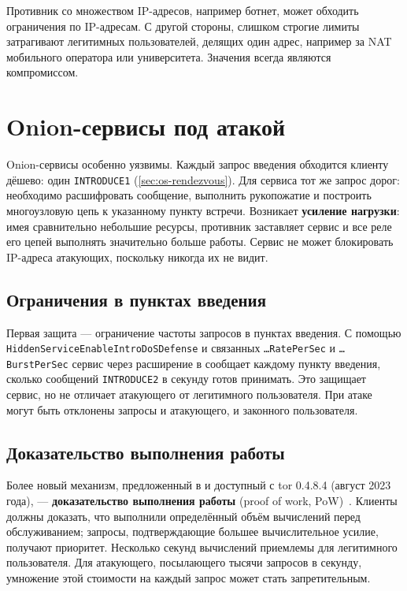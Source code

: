 \begin{attenzione}
Противник со множеством IP-адресов, например ботнет, может обходить ограничения по IP-адресам. С другой стороны, слишком строгие лимиты затрагивают легитимных пользователей, делящих один адрес, например за NAT мобильного оператора или университета. Значения всегда являются компромиссом.
\end{attenzione}

\section{Onion-сервисы под атакой}\label{sec:dos-onion}

Onion-сервисы особенно уязвимы. Каждый запрос введения обходится клиенту дёшево: один \texttt{INTRODUCE1} (\cref{sec:os-rendezvous}). Для сервиса тот же запрос дорог: необходимо расшифровать сообщение, выполнить рукопожатие и построить многоузловую цепь к указанному пункту встречи. Возникает \textbf{усиление нагрузки}: имея сравнительно небольшие ресурсы, противник заставляет сервис и все реле его цепей выполнять значительно больше работы. Сервис не может блокировать IP-адреса атакующих, поскольку никогда их не видит.

\subsection{Ограничения в пунктах введения}

Первая защита --- ограничение частоты запросов в пунктах введения. С помощью \texttt{HiddenService\-EnableIntroDoS\-Defense} и связанных \texttt{\ldots RatePerSec} и \texttt{\ldots BurstPerSec} сервис через расширение  в  сообщает каждому пункту введения, сколько сообщений \texttt{INTRODUCE2} в секунду готов принимать. Это защищает сервис, но не отличает атакующего от легитимного пользователя. При атаке могут быть отклонены запросы и атакующего, и законного пользователя.

\subsection{Доказательство выполнения работы}

Более новый механизм, предложенный в  и доступный с tor 0.4.8.4 (август 2023 года), --- \textbf{доказательство выполнения работы} (proof of work, PoW)~. Клиенты должны доказать, что выполнили определённый объём вычислений перед обслуживанием; запросы, подтверждающие большее вычислительное усилие, получают приоритет. Несколько секунд вычислений приемлемы для легитимного пользователя. Для атакующего, посылающего тысячи запросов в секунду, умножение этой стоимости на каждый запрос может стать запретительным.

